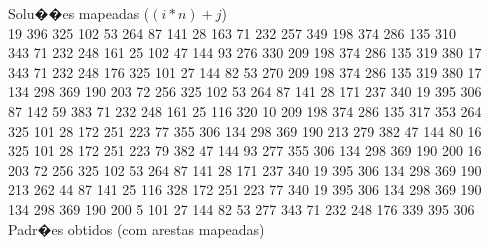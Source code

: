 
Solu��es mapeadas ($(i * n) + j$)\\

 19 396 325 102 53 264 87 141 28 163 71 232 257 349 198 374 286 135 310 \\
343 71 232 248 161 25 102 47 144 93 276 330 209 198 374 286 135 319 380 17 \\
343 71 232 248 176 325 101 27 144 82 53 270 209 198 374 286 135 319 380 17 \\
134 298 369 190 203 72 256 325 102 53 264 87 141 28 171 237 340 19 395 306 \\
87 142 59 383 71 232 248 161 25 116 320 10 209 198 374 286 135 317 353 264 \\
325 101 28 172 251 223 77 355 306 134 298 369 190 213 279 382 47 144 80 16 \\
325 101 28 172 251 223 79 382 47 144 93 277 355 306 134 298 369 190 200 16 \\
203 72 256 325 102 53 264 87 141 28 171 237 340 19 395 306 134 298 369 190 \\
213 262 44 87 141 25 116 328 172 251 223 77 340 19 395 306 134 298 369 190 \\
134 298 369 190 200 5 101 27 144 82 53 277 343 71 232 248 176 339 395 306 \\

Padr�es obtidos (com arestas mapeadas)\\


